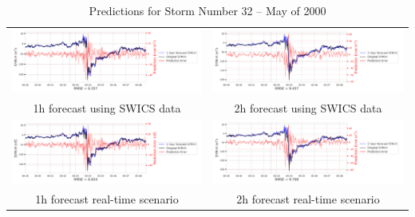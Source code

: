 \documentclass[draft,sw]{agutexSI2019}
\begin{document}
\begin{table}
\centering
\begin{tabular}{cc}
\includegraphics[width=0.49\linewidth]{paper_plots_shade/1h_swics/1h_swics_storm_32.png}
&
\includegraphics[width=0.49\linewidth]{paper_plots_shade/2h_swics/2h_swics_storm_32.png}
\\
1h forecast using SWICS data & 2h forecast using SWICS data
\vspace*{12pt}
\\
\includegraphics[width=0.49\linewidth]{paper_plots_shade/1h_rt/1h_rt_storm_32.png}
&
\includegraphics[width=0.49\linewidth]{paper_plots_shade/2h_rt/2h_rt_storm_32.png}
\\
1h forecast real-time scenario & 2h forecast real-time scenario 
\vspace*{12pt}
\\
\end{tabular}
\caption{Predictions for Storm Number 32 -- May of 2000}
\label{storm-32}
\end{table}
\end{document}
